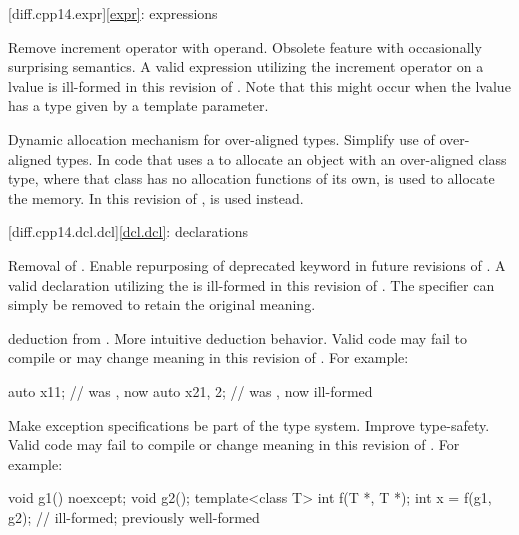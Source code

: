 [diff.cpp14.expr]{\ref{expr}: expressions}

\change
Remove increment operator with  operand.
\rationale
Obsolete feature with occasionally surprising semantics.
\effect
A valid \CppXIV{} expression utilizing the increment operator on
a  lvalue is ill-formed in this revision of \Cpp{}.
Note that this might occur when the lvalue has a type given by a template
parameter.

\change
Dynamic allocation mechanism for over-aligned types.
\rationale
Simplify use of over-aligned types.
\effect
In \CppXIV{} code that uses a 
to allocate an object with an over-aligned class type,
where that class has no allocation functions of its own,
is used to allocate the memory.
In this revision of \Cpp{},
is used instead.

[diff.cpp14.dcl.dcl]{\ref{dcl.dcl}: declarations}

%
\change
Removal of  .
\rationale
Enable repurposing of deprecated keyword in future revisions of \Cpp{}.
\effect
A valid \CppXIV{} declaration utilizing the 
 is ill-formed in this revision of \Cpp{}.
The specifier can simply be removed to retain the original meaning.

\change
{} deduction from .
\rationale
More intuitive deduction behavior.
\effect
Valid \CppXIV{} code may fail to compile or may change meaning
in this revision of \Cpp{}. For example:
\begin{codeblock}
auto x1{1};         // was , now 
auto x2{1, 2};      // was , now ill-formed
\end{codeblock}

\change
Make exception specifications be part of the type system.
\rationale
Improve type-safety.
\effect
Valid \CppXIV{} code may fail to compile or change meaning in this
revision of \Cpp{}.
For example:
\begin{codeblock}
void g1() noexcept;
void g2();
template<class T> int f(T *, T *);
int x = f(g1, g2);              // ill-formed; previously well-formed
\end{codeblock}

